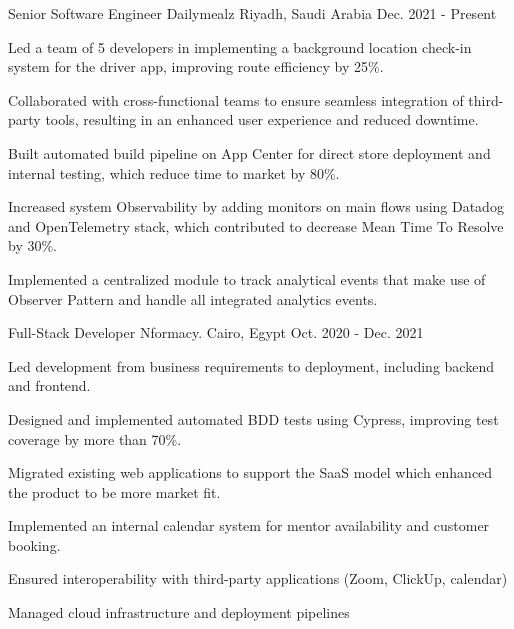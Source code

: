 

\begin{cventries}

  \cventry
    {Senior Software Engineer} %
    {Dailymealz} %
    {Riyadh, Saudi Arabia} %
    {Dec. 2021 - Present} %
    {
      \begin{cvitems} %
        \item {Led a team of 5 developers in implementing a background location check-in system for the driver app, improving route efficiency by 25\%.}
        \item {Collaborated with cross-functional teams to ensure seamless integration of third-party tools, resulting in an enhanced user experience and reduced downtime.}
        \item {Built automated build pipeline on App Center for direct store deployment and internal testing, which reduce time to market by 80\%.}
        \item {Increased system Observability by adding monitors on main flows using Datadog and OpenTelemetry stack, which contributed to decrease Mean Time To Resolve by 30\%.}
        \item {Implemented a centralized module to track analytical events that make use of Observer Pattern and handle all integrated analytics events.}
      \end{cvitems}
    }

  \cventry
    {Full-Stack Developer} %
    {Nformacy.} %
    {Cairo, Egypt} %
    {Oct. 2020 - Dec. 2021} %
    {
      \begin{cvitems} %
        \item {Led development from business requirements to deployment, including backend and frontend.}
        \item {Designed and implemented automated BDD tests using Cypress, improving test coverage by more than 70\%.}
        \item {Migrated existing web applications to support the SaaS model which enhanced the product to be more market fit.}
        \item {Implemented an internal calendar system for mentor availability and
customer booking.}
        \item {Ensured interoperability with third-party applications (Zoom,
ClickUp, calendar)}
        \item {Managed cloud infrastructure and deployment pipelines}
      \end{cvitems}
    }


\end{cventries}
